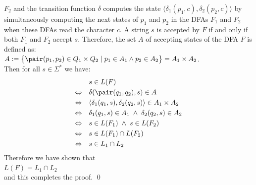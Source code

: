 $F_2$ and the transition function $\delta$ computes the state $\bigl\langle\delta_1(p_1,c), \delta_2(p_2,c)\bigr\rangle$
by simultaneously computing the next states of $p_1$ and $p_2$ in the \textsc{DFA}s $F_1$ and $F_2$ when these
\textsc{DFA}s read the character $c$.  A string $s$ is accepted by $F$ if and only if
both $F_1$ and  $F_2$ accept $s$.  Therefore, the set $A$ of accepting states of the \textsc{DFA} $F$ is defined as:
\\[0.2cm]
\hspace*{1.3cm}
$A := \bigl\{ \pair(p_1,p_2) \in Q_1 \times Q_2 \mid p_1 \in A_1 \wedge p_2 \in A_2 \bigr\} = A_1 \times A_2$.
\\[0.2cm]
Then for all $s \in \Sigma^*$ we have:
$$
\begin{array}[t]{cl}
                & s \in L(F)                                                           \\[0.1cm]
\Leftrightarrow & \delta(\pair(q_1,q_2), s) \in A                                      \\[0.1cm]
\Leftrightarrow & \langle \delta_1(q_1,s), \delta_2(q_2, s) \rangle \in A_1 \times A_2 \\[0.1cm]
\Leftrightarrow & \delta_1(q_1,s) \in A_1 \;\wedge\;  \delta_2(q_2, s) \in A_2             \\[0.1cm]
\Leftrightarrow & s \in L(F_1) \;\wedge\;  s \in L(F_2)                                    \\[0.1cm]
\Leftrightarrow & s \in L(F_1) \cap L(F_2)                                             \\[0.1cm]
\Leftrightarrow & s \in L_1 \cap L_2                                                 
\end{array}
$$
Therefore we have shown that
\\[0.2cm]
\hspace*{1.3cm}
 $L(F) = L_1 \cap L_2$ 
\\[0.2cm]
and this completes the proof. \qed

